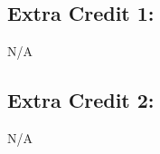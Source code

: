 \documentclass[main.tex]{subfiles}
\begin{document}
\subsection{Extra Credit 1: }
N/A
\subsection{Extra Credit 2:}
N/A
\end{document}
